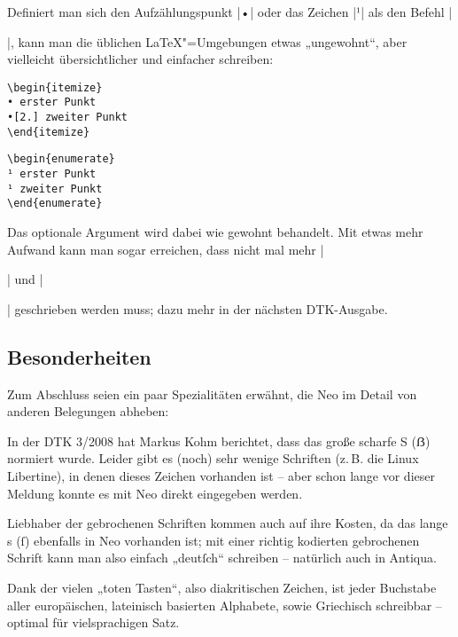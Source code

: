 \documentclass[ngerman]{dtk}
\begin{document}
{Definiert man sich den Aufzählungspunkt |•| oder das Zeichen |¹| als den Befehl |\item|, kann man die üblichen \LaTeX"=Umgebungen etwas „ungewohnt“, aber vielleicht übersichtlicher und einfacher schreiben:

\begin{minipage}{.4\textwidth}
\begin{verbatim}
\begin{itemize}
• erster Punkt
•[2.] zweiter Punkt
\end{itemize} 
\end{verbatim}
\end{minipage}
\hfill
\begin{minipage}{.4\textwidth}
\begin{verbatim}
\begin{enumerate}
¹ erster Punkt
¹ zweiter Punkt
\end{enumerate} 
\end{verbatim}
\end{minipage}

Das optionale Argument wird dabei wie gewohnt behandelt. Mit etwas mehr Aufwand kann man sogar erreichen, dass nicht mal mehr |\begin{itemize}| und |\end{itemize}| geschrieben werden muss; dazu mehr in der nächsten DTK-Ausgabe.

\subsection{Besonderheiten}
Zum Abschluss seien ein paar Spezialitäten erwähnt, die Neo im Detail von anderen Belegungen abheben:

In der DTK 3/2008 hat Markus Kohm berichtet, dass das große scharfe S ({ẞ}) normiert wurde. Leider gibt es (noch) sehr wenige Schriften (z.\,B. die Linux Libertine), in denen dieses Zeichen vorhanden ist – aber schon lange vor dieser Meldung konnte es mit Neo direkt eingegeben werden.

Liebhaber der gebrochenen Schriften kommen auch auf ihre Kosten, da das lange s (ſ) ebenfalls in Neo vorhanden ist; mit einer richtig kodierten gebrochenen Schrift kann man also einfach „deutſch“ schreiben – natürlich auch in Antiqua.

Dank der vielen „toten Tasten“, also diakritischen Zeichen, ist jeder Buchstabe aller europäischen, lateinisch basierten Alphabete, sowie Griechisch schreibbar – optimal für vielsprachigen Satz.

}
\end{document}
